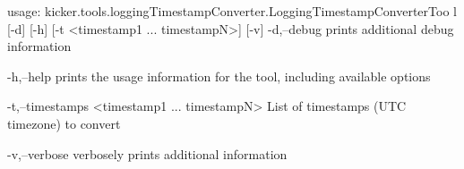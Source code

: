 usage:
       kicker.tools.loggingTimestampConverter.LoggingTimestampConverterToo
       l [-d] [-h] [-t <timestamp1 ... timestampN>] [-v]
 -d,--debug
        prints additional debug information

 -h,--help
        prints the usage information for the tool, including available
        options

 -t,--timestamps <timestamp1 ... timestampN>
        List of timestamps (UTC timezone) to convert

 -v,--verbose
        verbosely prints additional information